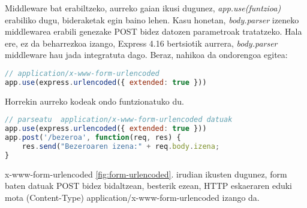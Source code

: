 Middleware bat erabiltzeko, aurreko gaian ikusi dugunez, \textit{app.use(funtzioa)} erabiliko dugu, bideraketak egin baino lehen. Kasu honetan, \textit{body.parser} izeneko middlewarea erabili genezake POST bidez datozen parametroak tratatzeko. Hala ere, ez da beharrezkoa izango, Express 4.16 bertsiotik aurrera, \textit{body.parser} middleware hau jada integratuta dago.
Beraz, nahikoa da ondorengoa egitea:

\begin{lstlisting}[language=JavaScript]
// application/x-www-form-urlencoded
app.use(express.urlencoded({ extended: true }))
\end{lstlisting}

Horrekin aurreko kodeak ondo funtzionatuko du. 

\begin{lstlisting}[language=JavaScript]
// parseatu  application/x-www-form-urlencoded datuak
app.use(express.urlencoded({ extended: true }))
app.post('/bezeroa', function(req, res) {
    res.send("Bezeroaren izena:" + req.body.izena;
}
\end{lstlisting}

\begin{alertinfo}{x-www-form-urlencoded}
\ref{fig:form-urlencoded}. irudian ikusten dugunez, form baten datuak POST bidez bidaltzean, besterik ezean, HTTP eskaeraren eduki mota (Content-Type) application/x-www-form-urlencoded izango da.
\end{alertinfo}






